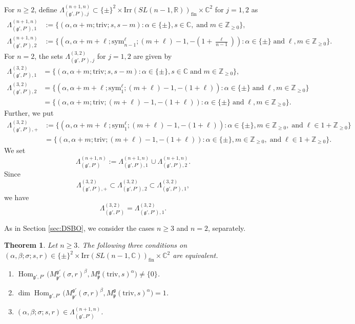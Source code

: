 \documentclass[reqno,11pt]{amsart}
\newtheorem{thm}[equation]{Theorem}
\theoremstyle{remark}
\theoremstyle{definition}
\numberwithin{equation}{section}
\newcommand{\gb}{\beta}
\newcommand{\ga}{\alpha}
\newcommand{\gL}{\Lambda}
\newcommand{\fg}{{\mathfrak g}}
\newcommand{\fp}{{\mathfrak p}}
\newcommand{\R}{\mathbb{R}}
\newcommand{\C}{\mathbb{C}}
\newcommand{\Z}{\mathbb{Z}}
\newcommand{\Hom}{\operatorname{Hom}}
\newcommand{\Irr}{\mathrm{Irr}}
\newcommand{\triv}{\mathrm{triv}}
\newcommand{\fin}{\mathrm{fin}}
\newcommand{\sym}{\mathrm{sym}}
\newcommand{\Mp}{M^{\fg}_{\fp}}
\newcommand{\Mpp}{M^{\fg'}_{\fp'}}
\begin{document}
For $n\geq 2$,
define $\gL^{(n+1,n)}_{(\fg', P'),j} \subset 
\{\pm\}^2\times \Irr(SL(n-1,\R))_{\fin} \times \C^2$ for $j=1,2$ as
\begin{align}
\gL^{(n+1,n)}_{(\fg', P'),1}&:=\{
(\ga,\ga+m;\triv; s,  s-m) : \alpha \in \{\pm\},s\in \C,  \; \text{and} \; m\in \Z_{\geq 0}\},
\label{eqn:gP1} \\[3pt]
\gL^{(n+1,n)}_{(\fg', P'),2}&:=\{
(\ga,\ga+m+\ell;\sym_{n-1}^\ell; (m+\ell)-1,  -(1+\tfrac{\ell}{n-1})) : \alpha \in \{\pm\}\; \text{and} \; \ell, m\in \Z_{\geq 0}\}.\label{eqn:gP}
\end{align}
For $n=2$, the sets $\gL^{(3,2)}_{(\fg', P'),j}$ for $j=1,2$ are given by
\begin{align*}
\gL^{(3,2)}_{(\fg', P'),1}&=\{
(\alpha, \alpha+m;\triv; s, s-m )
: \alpha \in \{\pm\}, s \in \C \; \text{and} \; m\in \Z_{\geq 0}\},\\[3pt]
\gL^{(3,2)}_{(\fg', P'),2}
&=\{
(\alpha, \alpha+m+\ell; \sym^\ell_1; (m+\ell)-1, -(1+\ell) )
: \alpha \in \{\pm\} \; \text{and} \; \ell, m\in \Z_{\geq 0}\}\\
&=\{
(\alpha, \alpha+m; \triv; (m+\ell)-1, -(1+\ell) )
: \alpha \in \{\pm\} \; \text{and} \; \ell, m\in \Z_{\geq 0}\}.
\end{align*}
Further, we put
\begin{align*}
\Lambda^{(3,2)}_{(\fg',P'),+}
&:=\{
(\alpha, \alpha+m+\ell; \sym^\ell_1; (m+\ell)-1, 
-(1+\ell)) : \alpha \in \{\pm\}, m\in \Z_{\geq 0}, \; \text{and} \; \ell\in 1+\Z_{\geq 0}\}\\
&=\{
(\alpha, \alpha+m; \triv; (m+\ell)-1, 
-(1+\ell)) : \alpha \in \{\pm\}, m\in \Z_{\geq 0}, \; \text{and} \; \ell\in 1+\Z_{\geq 0}\}.
\end{align*}
We set 
\begin{equation*}
\gL^{(n+1,n)}_{(\fg',P')}:=\gL^{(n+1,n)}_{(\fg',P'),1} 
\cup \gL^{(n+1,n)}_{(\fg',P'),2}.
\end{equation*}
Since
\begin{equation*}
\Lambda^{(3,2)}_{(\fg',P'),+} \subset 
\gL^{(3,2)}_{(\fg',P'),2} \subset \gL^{(3,2)}_{(\fg',P'),1},
\end{equation*}
we have
\begin{equation*}
\gL^{(3,2)}_{(\fg',P')} = \gL^{(3,2)}_{(\fg',P'),1}.
\end{equation*}

As in Section \ref{sec:DSBO}, we consider the cases $n\geq 3$ and $n =2$,
separately.

\begin{thm}\label{thm:Hom1a}
Let $n\geq 3$. The following three conditions on 
$(\alpha,\beta; \sigma; s, r) \in 
\{\pm\}^2\times \Irr(SL(n-1,\C))_{\fin} \times \C^2$
are equivalent.
\begin{enumerate}
\item[\emph{(i)}] 
$\Hom_{\fg',P'}\big(\Mpp(\sigma,r)^\gb, \Mp(\triv, s)^\ga\big)\neq \{0\}$.
\item[\emph{(ii)}] 
$\dim \Hom_{\fg', P'}\big(\Mpp(\sigma,r)^\gb, \Mp(\triv, s)^\ga\big) =1 $.
\item[\emph{(iii)}] 
$(\alpha,\beta; \sigma; s, r) \in \gL^{(n+1,n)}_{(\fg',P')}$.
\end{enumerate}
\end{thm}
\end{document}
